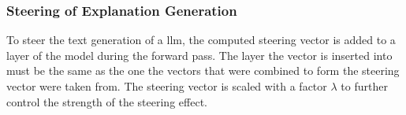 \subsubsection{Steering of Explanation Generation}
To steer the text generation of a \acl{llm}, the computed steering vector is added to a layer of the model during the forward pass. The layer the vector is inserted into must be the same as the one the vectors that were combined to form the steering vector were taken from. The steering vector is scaled with a factor \(\lambda\) to further control the strength of the steering effect.
